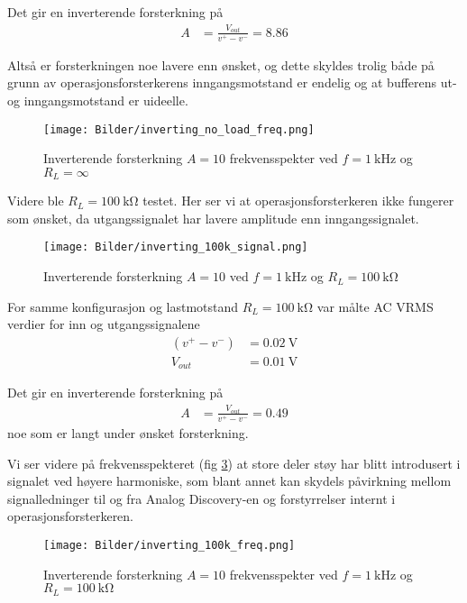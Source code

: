 Det gir en inverterende forsterkning på
\begin{align*}
    A &= \frac{V_{out}}{v^+ - v^-} = 8.86
\end{align*}

Altså er forsterkningen noe lavere enn ønsket, og dette skyldes trolig både på grunn av 
operasjonsforsterkerens inngangsmotstand er endelig og at bufferens ut- og inngangsmotstand er uideelle.

\begin{figure}[H]
    \centering
    \texttt{[image: Bilder/inverting\_no\_load\_freq.png]}
    \caption{Inverterende forsterkning $A = 10$ frekvensspekter ved $f=\SI{1}{\kilo\hertz}$ og $R_L = \infty$}
    \label{fig:inverting_no_load_freq}
\end{figure}

Videre ble $R_L = \SI{100}{\kilo\ohm}$ testet. Her ser vi at operasjonsforsterkeren ikke fungerer som ønsket, da 
utgangssignalet har lavere amplitude enn inngangssignalet.

\begin{figure}[H]
    \centering
    \texttt{[image: Bilder/inverting\_100k\_signal.png]}
    \caption{Inverterende forsterkning $A = 10$ ved $f=\SI{1}{\kilo\hertz}$ og $R_L = \SI{100}{\kilo\ohm}$}
    \label{fig:inverting_100k_signal}
\end{figure}

For samme konfigurasjon og lastmotstand $R_L = \SI{100}{\kilo\ohm}$ var målte AC VRMS verdier for inn og utgangssignalene
\begin{align*}
    (v^+ - v^-) &= \SI{0.02}{\volt} \\
    V_{out} &= \SI{0.01}{\volt}
\end{align*}

Det gir en inverterende forsterkning på
\begin{align*}
    A &= \frac{V_{out}}{v^+ - v^-} = 0.49
\end{align*}
noe som er langt under ønsket forsterkning.

Vi ser videre på frekvensspekteret (fig \ref{fig:inverting_100k_freq}) at store deler støy har blitt introdusert i signalet ved høyere harmoniske, som blant 
annet kan skydels påvirkning mellom signalledninger til og fra Analog Discovery-en og 
forstyrrelser internt i operasjonsforsterkeren.

\begin{figure}[H]
    \centering
    \texttt{[image: Bilder/inverting\_100k\_freq.png]}
    \caption{Inverterende forsterkning $A = 10$ frekvensspekter ved $f=\SI{1}{\kilo\hertz}$ og $R_L = \SI{100}{\kilo\ohm}$}
    \label{fig:inverting_100k_freq}
\end{figure}
